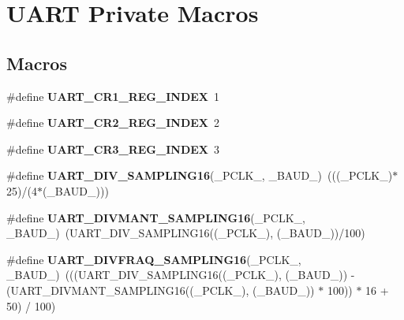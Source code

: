 \hypertarget{group___u_a_r_t___private___macros}{\section{U\-A\-R\-T Private Macros}
\label{group___u_a_r_t___private___macros}
}
\subsection*{Macros}
\begin{DoxyCompactItemize}
\item 
\hypertarget{group___u_a_r_t___private___macros_ga5917bcb19b2dab202b8cbfa82520b93e}{\#define {\bfseries U\-A\-R\-T\-\_\-\-C\-R1\-\_\-\-R\-E\-G\-\_\-\-I\-N\-D\-E\-X}~1}\label{group___u_a_r_t___private___macros_ga5917bcb19b2dab202b8cbfa82520b93e}

\item 
\hypertarget{group___u_a_r_t___private___macros_ga3a8b0ee44c75493eb001e60a9876e586}{\#define {\bfseries U\-A\-R\-T\-\_\-\-C\-R2\-\_\-\-R\-E\-G\-\_\-\-I\-N\-D\-E\-X}~2}\label{group___u_a_r_t___private___macros_ga3a8b0ee44c75493eb001e60a9876e586}

\item 
\hypertarget{group___u_a_r_t___private___macros_gac9cb22110b40ab2261468436e3038524}{\#define {\bfseries U\-A\-R\-T\-\_\-\-C\-R3\-\_\-\-R\-E\-G\-\_\-\-I\-N\-D\-E\-X}~3}\label{group___u_a_r_t___private___macros_gac9cb22110b40ab2261468436e3038524}

\item 
\hypertarget{group___u_a_r_t___private___macros_gabd6dd99fff6cd5c0374780fd72a61e6e}{\#define {\bfseries U\-A\-R\-T\-\_\-\-D\-I\-V\-\_\-\-S\-A\-M\-P\-L\-I\-N\-G16}(\-\_\-\-P\-C\-L\-K\-\_\-, \-\_\-\-B\-A\-U\-D\-\_\-)~(((\-\_\-\-P\-C\-L\-K\-\_\-)$\ast$25)/(4$\ast$(\-\_\-\-B\-A\-U\-D\-\_\-)))}\label{group___u_a_r_t___private___macros_gabd6dd99fff6cd5c0374780fd72a61e6e}

\item 
\hypertarget{group___u_a_r_t___private___macros_ga9cd479aff25c454d9d4f3c1c20517c86}{\#define {\bfseries U\-A\-R\-T\-\_\-\-D\-I\-V\-M\-A\-N\-T\-\_\-\-S\-A\-M\-P\-L\-I\-N\-G16}(\-\_\-\-P\-C\-L\-K\-\_\-, \-\_\-\-B\-A\-U\-D\-\_\-)~(U\-A\-R\-T\-\_\-\-D\-I\-V\-\_\-\-S\-A\-M\-P\-L\-I\-N\-G16((\-\_\-\-P\-C\-L\-K\-\_\-), (\-\_\-\-B\-A\-U\-D\-\_\-))/100)}\label{group___u_a_r_t___private___macros_ga9cd479aff25c454d9d4f3c1c20517c86}

\item 
\hypertarget{group___u_a_r_t___private___macros_gade99ebfd7502df11b366c48fac5417d7}{\#define {\bfseries U\-A\-R\-T\-\_\-\-D\-I\-V\-F\-R\-A\-Q\-\_\-\-S\-A\-M\-P\-L\-I\-N\-G16}(\-\_\-\-P\-C\-L\-K\-\_\-, \-\_\-\-B\-A\-U\-D\-\_\-)~(((U\-A\-R\-T\-\_\-\-D\-I\-V\-\_\-\-S\-A\-M\-P\-L\-I\-N\-G16((\-\_\-\-P\-C\-L\-K\-\_\-), (\-\_\-\-B\-A\-U\-D\-\_\-)) -\/ (U\-A\-R\-T\-\_\-\-D\-I\-V\-M\-A\-N\-T\-\_\-\-S\-A\-M\-P\-L\-I\-N\-G16((\-\_\-\-P\-C\-L\-K\-\_\-), (\-\_\-\-B\-A\-U\-D\-\_\-)) $\ast$ 100)) $\ast$ 16 + 50) / 100)}\label{group___u_a_r_t___private___macros_gade99ebfd7502df11b366c48fac5417d7}


\end{DoxyCompactItemize}
